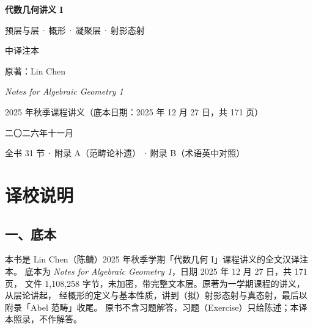 \begin{titlepage}
\centering
\vspace*{3.2cm}

{\sffamily\bfseries\fontsize{34}{40}\selectfont 代数几何讲义 I\par}

\vspace{0.9cm}
{\sffamily\Large 预层与层\,·\,概形\,·\,凝聚层\,·\,射影态射\par}

\vspace{2.2cm}
{\LARGE\kaishu 中译注本\par}

\vspace{2.6cm}
{\large 原著：Lin Chen\par}
\vspace{0.35cm}
{\large \textit{Notes for Algebraic Geometry 1}\par}
\vspace{0.35cm}
{\large 2025 年秋季课程讲义（底本日期：2025 年 12 月 27 日，共 171 页）\par}

\vfill

{\large 二〇二六年十一月\par}
\vspace{0.6cm}
{\small 全书 31 节\,·\,附录 A（范畴论补遗）\,·\,附录 B（术语英中对照）\par}
\end{titlepage}

\clearpage
\section*{译校说明}

\subsection*{一、底本}

本书是 Lin Chen（陈麟）2025 年秋季学期「代数几何 I」课程讲义的全文汉译注本。
底本为 \textit{Notes for Algebraic Geometry 1}，日期 2025 年 12 月 27 日，共 171 页，
文件 1,108,258 字节，未加密，带完整文本层。原著为一学期课程的讲义，从层论讲起，
经概形的定义与基本性质，讲到（拟）射影态射与真态射，最后以附录「Abel 范畴」收尾。
原书不含习题解答，习题（Exercise）只给陈述；本译本照录，不作解答。

